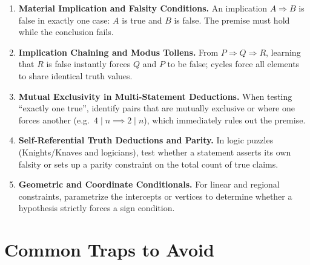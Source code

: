 \documentclass[11pt,a4paper]{article}
\begin{document}
\begin{enumerate}[leftmargin=2em, itemsep=4pt]
  \item \textbf{Material Implication and Falsity Conditions.}
        An implication $A \Rightarrow B$ is false in exactly one case: $A$ is true and $B$ is false. The premise must hold while the conclusion fails. 
  \item \textbf{Implication Chaining and Modus Tollens.}
        From $P \Rightarrow Q \Rightarrow R$, learning that $R$ is false instantly forces $Q$ and $P$ to be false; cycles force all elements to share identical truth values. 
  \item \textbf{Mutual Exclusivity in Multi-Statement Deductions.}
        When testing ``exactly one true'', identify pairs that are mutually exclusive or where one forces another (e.g.\ $4 \mid n \implies 2 \mid n$), which immediately rules out the premise. 
  \item \textbf{Self-Referential Truth Deductions and Parity.}
        In logic puzzles (Knights/Knaves and logicians), test whether a statement asserts its own falsity or sets up a parity constraint on the total count of true claims. 
  \item \textbf{Geometric and Coordinate Conditionals.}
        For linear and regional constraints, parametrize the intercepts or vertices to determine whether a hypothesis strictly forces a sign condition. 
\end{enumerate}

\section*{Common Traps to Avoid}
\end{document}
